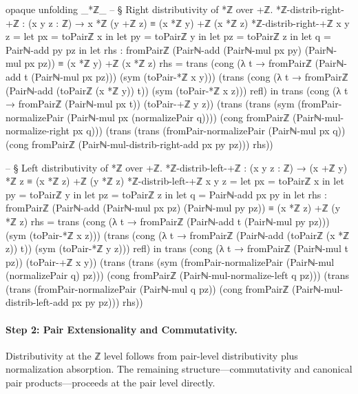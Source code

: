\documentclass[11pt,a4paper]{book}
\begin{document}
\begin{code}
opaque
  unfolding _*ℤ_
  -- § Right distributivity of *ℤ over +ℤ.
  *ℤ-distrib-right-+ℤ : (x y z : ℤ) → x *ℤ (y +ℤ z) ≡ (x *ℤ y) +ℤ (x *ℤ z)
  *ℤ-distrib-right-+ℤ x y z =
    let px = toPairℤ x in
    let py = toPairℤ y in
    let pz = toPairℤ z in
    let q  = Pairℕ-add py pz in
    let rhs : fromPairℤ (Pairℕ-add (Pairℕ-mul px py) (Pairℕ-mul px pz)) ≡ (x *ℤ y) +ℤ (x *ℤ z)
        rhs =
          trans
            (cong (λ t → fromPairℤ (Pairℕ-add t (Pairℕ-mul px pz))) (sym (toPair-*ℤ x y)))
            (trans
              (cong (λ t → fromPairℤ (Pairℕ-add (toPairℤ (x *ℤ y)) t)) (sym (toPair-*ℤ x z)))
              refl)
    in
    trans
      (cong (λ t → fromPairℤ (Pairℕ-mul px t)) (toPair-+ℤ y z))
      (trans
        (trans
          (sym (fromPair-normalizePair (Pairℕ-mul px (normalizePair q))))
          (cong fromPairℤ (Pairℕ-mul-normalize-right px q)))
        (trans
          (trans
            (fromPair-normalizePair (Pairℕ-mul px q))
            (cong fromPairℤ (Pairℕ-mul-distrib-right-add px py pz)))
          rhs))

  -- § Left distributivity of *ℤ over +ℤ.
  *ℤ-distrib-left-+ℤ : (x y z : ℤ) → (x +ℤ y) *ℤ z ≡ (x *ℤ z) +ℤ (y *ℤ z)
  *ℤ-distrib-left-+ℤ x y z =
    let px = toPairℤ x in
    let py = toPairℤ y in
    let pz = toPairℤ z in
    let q  = Pairℕ-add px py in
    let rhs : fromPairℤ (Pairℕ-add (Pairℕ-mul px pz) (Pairℕ-mul py pz)) ≡ (x *ℤ z) +ℤ (y *ℤ z)
        rhs =
          trans
            (cong (λ t → fromPairℤ (Pairℕ-add t (Pairℕ-mul py pz))) (sym (toPair-*ℤ x z)))
            (trans
              (cong (λ t → fromPairℤ (Pairℕ-add (toPairℤ (x *ℤ z)) t)) (sym (toPair-*ℤ y z)))
              refl)
    in
    trans
      (cong (λ t → fromPairℤ (Pairℕ-mul t pz)) (toPair-+ℤ x y))
      (trans
        (trans
          (sym (fromPair-normalizePair (Pairℕ-mul (normalizePair q) pz)))
          (cong fromPairℤ (Pairℕ-mul-normalize-left q pz)))
        (trans
          (trans
            (fromPair-normalizePair (Pairℕ-mul q pz))
            (cong fromPairℤ (Pairℕ-mul-distrib-left-add px py pz)))
          rhs))
\end{code}

\paragraph{Step 2: Pair Extensionality and Commutativity.}
Distributivity at the ℤ level follows from pair-level distributivity
plus normalization absorption. The remaining structure---commutativity
and canonical pair products---proceeds at the pair level directly.
\end{document}

